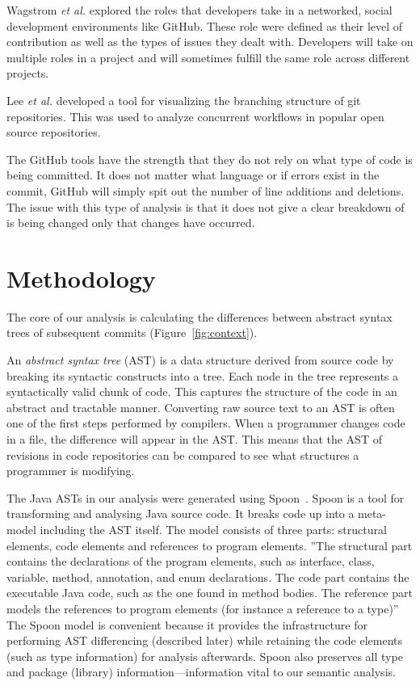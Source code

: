 \documentclass[conference]{IEEEtran}
\begin{document}
Wagstrom \textit{et al.} \cite{Patrick:Wagstrom:2012} explored the roles that developers take in a networked, social development environments like GitHub. These role were defined as their level of contribution as well as the types of issues they dealt with. Developers will take on multiple roles in a project and will sometimes fulfill the same role across different projects.

Lee \textit{et al.} \cite{lee2013} developed a tool for visualizing the branching structure of git repositories. This was used to analyze concurrent workflows in popular open source repositories.

The GitHub tools have the strength that they do not rely on what type of code is being committed. It does not matter what language or if errors exist in the commit, GitHub will simply spit out the number of line additions and deletions. The issue with this type of analysis is that it does not give a clear breakdown of is being changed only that changes have occurred.

\section{Methodology}
\label{sec:methodology}

The core of our analysis is calculating the differences between abstract syntax trees of subsequent commits (Figure~\ref{fig:context}).

An \emph{abstract syntax tree} (AST) is a data structure derived from source code by breaking its syntactic constructs into a tree. Each node in the tree represents a syntactically valid chunk of code. This captures the structure of the code in an abstract and tractable manner. Converting raw source text to an AST is often one of the first steps performed by compilers. When a programmer changes code in a file, the difference will appear in the AST. This means that the AST of revisions in code repositories can be compared to see what structures a programmer is modifying.

The Java ASTs in our analysis were generated using Spoon~\cite{pawlak:hal-01169705}. Spoon is a tool for transforming and analysing Java source code. It breaks code up into a meta-model including the AST itself. The model consists of three parts: structural elements, code elements and references to program elements. ''The structural part contains the declarations of the program elements, such as interface, class, variable, method, annotation, and enum declarations.  The code part contains the executable Java code, such as the one found in method bodies.  The reference part models the references to program elements (for instance a reference to a type)'' \cite{pawlak:hal-01169705} The Spoon model is convenient because it provides the infrastructure for performing AST differencing (described later) while retaining the code elements (such as type information) for analysis afterwards. Spoon also preserves all type and package (library) information—information vital to our semantic analysis.
\end{document}
